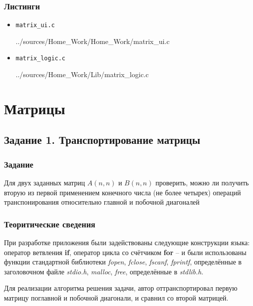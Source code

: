 \documentclass[12pt,a4paper]{report}
\begin{document}
\subsection*{Листинги}
\begin{itemize}
\item[] \verb-matrix_ui.c-

{../sources/Home_Work/Home_Work/matrix_ui.c}

\item[] \verb-matrix_logic.c-

{../sources/Home_Work/Lib/matrix_logic.c}
\end{itemize}


%
\chapter{Матрицы}
\section{Задание 1. Транспортирование матрицы}
\subsection{Задание}
\hspace{\parindent}
Для двух заданных матриц $A(n,n)$ и $B(n,n)$ проверить, можно ли получить вторую из первой применением конечного числа (не более четырех) операций транспонирования относительно главной и побочной диагоналей

\subsection{Теоритические сведения}
\hspace{\parindent}
При разработке приложения были задействованы следующие конструкции языка: оператор ветвления \textbf{if}, оператор цикла со счётчиком \textbf{for} -- и были использованы функции стандартной библиотеки \textit{fopen}, \textit{fclose}, \textit{fscanf}, \textit{fprintf}, определённые в заголовочном файле \textit{stdio.h}, \textit{malloc}, \textit{free}, определённые в \textit{stdlib.h}.

\hspace{\parindent}
Для реализации алгоритма решения задачи, автор оттранспортировал первую матрицу поглавной и побочной диагонали, и сравнил со второй матрицей. 
\end{document}

